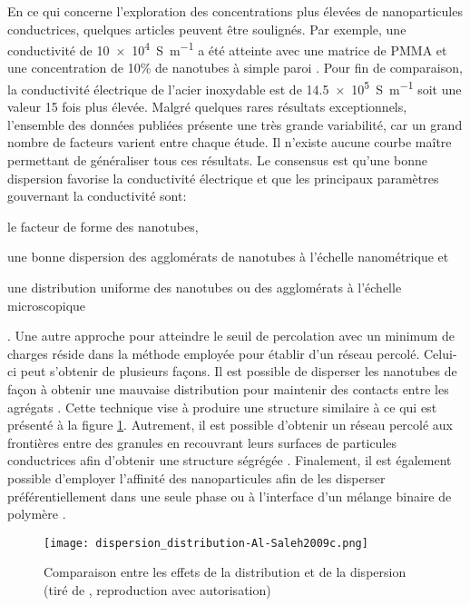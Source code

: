 \FloatBarrier
En ce qui concerne l'exploration des concentrations plus élevées de nanoparticules conductrices, quelques articles peuvent être soulignés. 
Par exemple, une conductivité de \SI[locale=FR]{10e4}{\siemens\per\metre} a été atteinte avec une matrice de PMMA et une concentration de 10\% de nanotubes à simple paroi \cite{Bauhofer2009}. 
Pour fin de comparaison, la conductivité électrique de l'acier inoxydable est de \SI[locale=FR]{14.5e5}{\siemens\per\metre} soit une valeur 15 fois plus élevée. 
Malgré quelques rares résultats exceptionnels, l'ensemble des données publiées présente une très grande variabilité, car un grand nombre de facteurs varient entre chaque étude.
Il n'existe aucune courbe maître permettant de généraliser tous ces résultats. 
Le consensus est qu'une bonne dispersion favorise la conductivité électrique \cite{Bauhofer2009} et que les principaux paramètres gouvernant la conductivité sont: 
\begin{inparaenum}
	\item le facteur de forme des nanotubes, 
	\item une bonne dispersion des agglomérats de nanotubes à l'échelle nanométrique et
	\item une distribution uniforme des nanotubes ou des agglomérats à l'échelle microscopique   
\end{inparaenum} \cite{Li2007a}.
Une autre approche pour atteindre le seuil de percolation avec un minimum de charges réside dans la méthode employée pour établir d'un réseau percolé. 
Celui-ci peut s'obtenir de plusieurs façons. 
Il est possible de disperser les nanotubes de façon à obtenir une mauvaise distribution pour maintenir des contacts entre les agrégats \cite{Al-Saleh2009c,Deng2014a}. 
Cette technique vise à produire une structure similaire à ce qui est présenté à la figure \ref{fig:dispersion_distribution}. 
Autrement, il est possible d'obtenir un réseau percolé aux frontières entre des granules en recouvrant leurs surfaces de particules conductrices afin d'obtenir une structure ségrégée \cite{Al-Saleh2011,Pang2014c}. 
Finalement, il est également possible d'employer l'affinité des nanoparticules afin de les disperser préférentiellement dans une seule phase ou à l'interface d'un mélange binaire de polymère \cite{Pang2014c,Deng2014a}. 

\begin{figure}[h]
	\centering
	\texttt{[image: dispersion\_distribution-Al-Saleh2009c.png]}
	\caption{Comparaison entre les effets de la distribution et de la dispersion (tiré de \cite{Al-Saleh2009c}, reproduction avec autorisation)}
	\label{fig:dispersion_distribution}
\end{figure}

